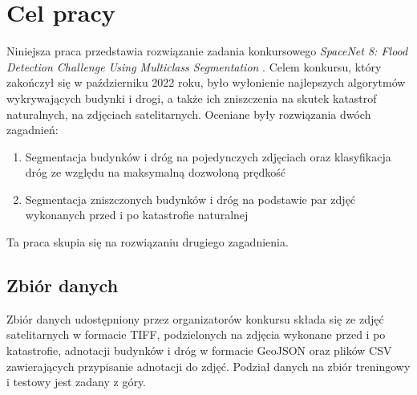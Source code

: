 \newpage %
\section{Cel pracy}
Niniejsza praca przedstawia rozwiązanie zadania konkursowego \textit{SpaceNet 8: Flood Detection Challenge Using Multiclass Segmentation} \cite{spacenet8}. Celem konkursu, który zakończył się w październiku 2022 roku, było wyłonienie najlepszych algorytmów wykrywających budynki i drogi, a także ich zniszczenia na skutek katastrof naturalnych, na zdjęciach satelitarnych. Oceniane były rozwiązania dwóch zagadnień:
\begin{enumerate}
\item Segmentacja budynków i dróg na pojedynczych zdjęciach oraz klasyfikacja dróg ze względu na maksymalną dozwoloną prędkość
\item Segmentacja zniszczonych budynków i dróg na podstawie par zdjęć wykonanych przed i po katastrofie naturalnej
\end{enumerate}
Ta praca skupia się na rozwiązaniu drugiego zagadnienia.
\subsection{Zbiór danych}
Zbiór danych udostępniony przez organizatorów konkursu składa się ze zdjęć satelitarnych w formacie TIFF, podzielonych na zdjęcia wykonane przed i po katastrofie, adnotacji budynków i dróg w formacie GeoJSON oraz plików CSV zawierających przypisanie adnotacji do zdjęć. Podział danych na zbiór treningowy i testowy jest zadany z góry.

